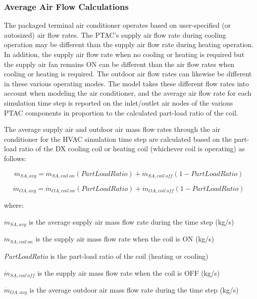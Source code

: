 \subsubsection{Average Air Flow Calculations}\label{average-air-flow-calculations-000}

The packaged terminal air conditioner operates based on user-specified (or autosized) air flow rates. The PTAC's supply air flow rate during cooling operation may be different than the supply air flow rate during heating operation. In addition, the supply air flow rate when no cooling or heating is required but the supply air fan remains ON can be different than the air flow rates when cooling or heating is required. The outdoor air flow rates can likewise be different in these various operating modes. The model takes these different flow rates into account when modeling the air conditioner, and the average air flow rate for each simulation time step is reported on the inlet/outlet air nodes of the various PTAC components in proportion to the calculated part-load ratio of the coil.

The average supply air and outdoor air mass flow rates through the air conditioner for the HVAC simulation time step are calculated based on the part-load ratio of the DX cooling coil or heating coil (whichever coil is operating) as follows:

\begin{equation}
  \dot{m}_{SA,avg} = \dot{m}_{SA,coil~on} \left( PartLoadRatio \right) + \dot{m}_{SA,coil~off} \left( 1 - PartLoadRatio \right)
\end{equation}

\begin{equation}
  \dot{m}_{OA,avg} = \dot{m}_{OA,coil~on} \left( PartLoadRatio \right) + \dot{m}_{OA,coil~off} \left( 1 - PartLoadRatio \right)
\end{equation}

where:

\(\dot{m}_{SA,avg}\) is the average supply air mass flow rate during the time step (kg/s)

\(\dot{m}_{SA,coil~on}\) is the supply air mass flow rate when the coil is ON (kg/s)

\emph{PartLoadRatio} is the part-load ratio of the coil (heating or cooling)

\(\dot{m}_{SA,coil~off}\) is the supply air mass flow rate when the coil is OFF (kg/s)

\(\dot{m}_{OA,avg}\) is the average outdoor air mass flow rate during the time step (kg/s)

